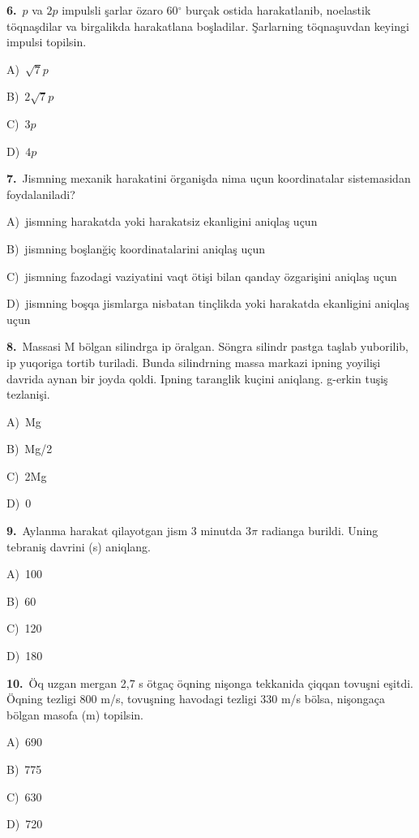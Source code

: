 \documentclass[11pt,a4paper]{article}
\newcommand{\opt}[2]{\hspace*{4mm}#1)\ #2\par}
\begin{document}
\noindent\begin{minipage}{\linewidth}
\textbf{6.}\ $p$ va $2p$ impulsli şarlar özaro 60$^\circ$ burçak ostida harakatlanib, noelastik töqnaşdilar va birgalikda harakatlana boşladilar. Şarlarning töqnaşuvdan keyingi impulsi topilsin.\par\smallskip
\opt{A}{$\sqrt{7}p$}
\opt{B}{$2\sqrt{7}p$}
\opt{C}{$3p$}
\opt{D}{$4p$}
\end{minipage}\vspace{9pt}\par
\noindent\begin{minipage}{\linewidth}
\textbf{7.}\ Jismning mexanik harakatini örganişda nima uçun koordinatalar sistemasidan foydalaniladi?\par\smallskip
\opt{A}{jismning harakatda yoki harakatsiz ekanligini aniqlaş uçun}
\opt{B}{jismning boşlanğiç koordinatalarini aniqlaş uçun}
\opt{C}{jismning fazodagi vaziyatini vaqt ötişi bilan qanday özgarişini aniqlaş uçun}
\opt{D}{jismning boşqa jismlarga nisbatan tinçlikda yoki harakatda ekanligini aniqlaş uçun}
\end{minipage}\vspace{9pt}\par
\noindent\begin{minipage}{\linewidth}
\textbf{8.}\ Massasi M bölgan silindrga ip öralgan. Söngra silindr pastga taşlab yuborilib, ip yuqoriga tortib turiladi. Bunda silindrning massa markazi ipning yoyilişi davrida aynan bir joyda qoldi. Ipning taranglik kuçini aniqlang. g-erkin tuşiş tezlanişi.\par\smallskip
\opt{A}{Mg}
\opt{B}{Mg/2}
\opt{C}{2Mg}
\opt{D}{0}
\end{minipage}\vspace{9pt}\par
\noindent\begin{minipage}{\linewidth}
\textbf{9.}\ Aylanma harakat qilayotgan jism 3 minutda 3$\pi$ radianga burildi. Uning tebraniş davrini (s) aniqlang.\par\smallskip
\opt{A}{100}
\opt{B}{60}
\opt{C}{120}
\opt{D}{180}
\end{minipage}\vspace{9pt}\par
\noindent\begin{minipage}{\linewidth}
\textbf{10.}\ Öq uzgan mergan 2,7 s ötgaç öqning nişonga tekkanida çiqqan tovuşni eşitdi. Öqning tezligi 800 m/s, tovuşning havodagi tezligi 330 m/s bölsa, nişongaça bölgan masofa (m) topilsin.\par\smallskip
\opt{A}{690}
\opt{B}{775}
\opt{C}{630}
\opt{D}{720}
\end{minipage}\vspace{9pt}\par
\end{document}
